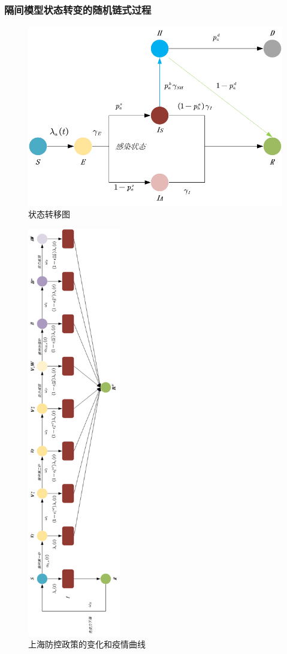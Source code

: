 \documentclass[bwprint]{gmcmthesis}
\numberwithin{figure}{section}
\begin{document}
\subsubsection{隔间模型状态转变的随机链式过程}

\begin{figure}[!h]
\centering
\includegraphics[width=.75\textwidth]{seirhd.png}
\caption{状态转移图}
\label{fig3}
\end{figure}



\begin{figure}[!h]
\centering
\includegraphics[width=0.36\textwidth]{vaccine.png}
\caption{上海防控政策的变化和疫情曲线}
\label{fig3}
\end{figure}
\end{document}
